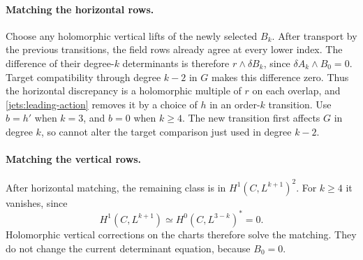 \paragraph{Matching the horizontal rows.}
Choose any holomorphic vertical lifts of the newly selected $B_k$.
After transport by the previous transitions, the field rows already
agree at every lower index.  The difference of their degree-$k$
determinants is therefore $r\wedge\delta B_k$, since
$\delta A_k\wedge B_0=0$.  Target compatibility through degree
$k-2$ in $G$ makes this difference zero.  Thus the horizontal
discrepancy is a holomorphic multiple of $r$ on each overlap, and
\eqref{jets:leading-action} removes it by a choice of $h$ in an
order-$k$ transition.  Use $b=h'$ when $k=3$, and $b=0$ when
$k\geq4$.
The new transition first affects $G$ in degree $k$, so cannot alter
the target comparison just used in degree $k-2$.

\paragraph{Matching the vertical rows.}
After horizontal matching, the remaining class is in
$H^1(C,L^{k+1})^2$.
For $k\geq4$ it vanishes, since
\begin{equation}\label{jets:vertical-vanishing}
 H^1(C,L^{k+1})\simeq H^0(C,L^{3-k})^*=0.
\end{equation}
Holomorphic vertical corrections on the charts therefore solve the
matching.  They do not change the current determinant equation,
because $B_0=0$.

